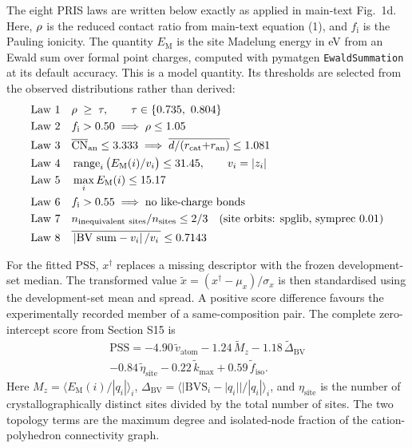 The eight PRIS laws are written below exactly as applied in main-text Fig.~1d. Here,
$\rho{}$ is the reduced contact ratio from main-text equation (1), and
$f_{\mathrm{i}}$ is the Pauling ionicity. The quantity $E_{\mathrm{M}}$ is the site
Madelung energy in eV from an Ewald sum over formal point charges, computed with pymatgen
\texttt{EwaldSummation} at its default accuracy. This is a model quantity. Its thresholds are selected from the observed distributions rather than derived:
\begin{align*}
  \text{Law~1}\quad & \rho{} \;\geq\; \tau, \qquad \tau \in \{0.735,\ 0.804\} \\
  \text{Law~2}\quad & f_{\mathrm{i}} > 0.50 \;\Longrightarrow\; \rho{} \leq 1.05 \\
  \text{Law~3}\quad & \overline{\mathrm{CN}}_{\mathrm{an}} \leq 3.333
  \;\Longrightarrow\; \overline{d/(r_{\mathrm{cat}}{+}r_{\mathrm{an}})} \leq 1.081 \\
  \text{Law~4}\quad & \operatorname{range}_i \big(E_{\mathrm{M}}(i)/v_i\big) \leq 31.45,
  \qquad v_i=|z_i| \\
  \text{Law~5}\quad & \max_i E_{\mathrm{M}}(i) \leq 15.17 \\
  \text{Law~6}\quad & f_{\mathrm{i}} > 0.55 \;\Longrightarrow\; \text{no like-charge bonds} \\
  \text{Law~7}\quad & n_{\mathrm{inequivalent\ sites}} / n_{\mathrm{sites}} \leq 2/3
  \quad \text{(site orbits: spglib, symprec 0.01)} \\
  \text{Law~8}\quad & \overline{\,|\mathrm{BV\ sum} - v_i|\,/v_i\,} \leq 0.7143
\end{align*}

For the fitted PSS, \(x^\dagger\) replaces a missing descriptor with the frozen
development-set median. The transformed value
\(\widetilde{x}=(x^\dagger-\mu_x)/\sigma_x\) is then standardised using the
development-set mean and spread. A positive score difference favours the experimentally
recorded member of a same-composition pair. The complete zero-intercept score from Section S15
is
\begin{multline*}
\mathrm{PSS} = -4.90\,\widetilde v_{\mathrm{atom}}
  -1.24\,\widetilde M_z-1.18\,\widetilde\Delta_{\mathrm{BV}} \\
  -0.84\,\widetilde\eta_{\mathrm{site}}
  -0.22\,\widetilde k_{\max}+0.59\,\widetilde f_{\mathrm{iso}}.
\end{multline*}
Here \(M_z=\langle E_{\mathrm{M}}(i)/|q_i|\rangle_i\),
\(\Delta_{\mathrm{BV}}=\langle|\mathrm{BVS}_i-|q_i||/|q_i|\rangle_i\), and
\(\eta_{\mathrm{site}}\) is the number of crystallographically distinct sites divided by
the total number of sites. The two topology terms are the maximum degree and isolated-node
fraction of the cation-polyhedron connectivity graph.

